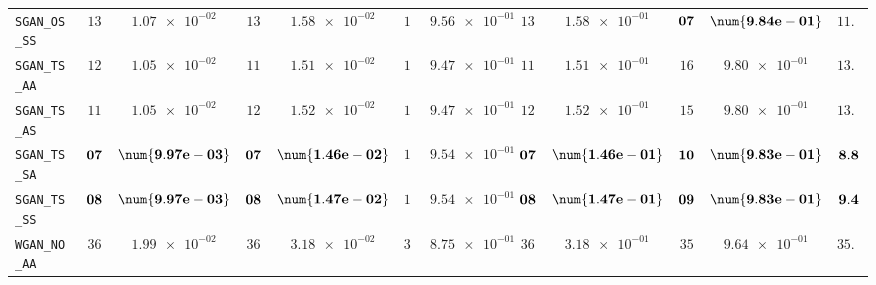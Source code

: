 \begin{xltabular}{\textwidth}{l||cC|cC|cC|cC|cC||c}
	\texttt{SGAN\_OS\_SS} & $ 13$ & $ \num{1.07e-02}$ & $ 13$ & $ \num{1.58e-02}$ & $ 12$ & $ \num{9.56e-01}$ & $ 13$ & $ \num{1.58e-01}$ & $\bf 07$ & $\bf \num{9.84e-01}$ & $ 11.6$  \\
	\texttt{SGAN\_TS\_AA} & $ 12$ & $ \num{1.05e-02}$ & $ 11$ & $ \num{1.51e-02}$ & $ 18$ & $ \num{9.47e-01}$ & $ 11$ & $ \num{1.51e-01}$ & $ 16$ & $ \num{9.80e-01}$ & $ 13.6$  \\
	\texttt{SGAN\_TS\_AS} & $ 11$ & $ \num{1.05e-02}$ & $ 12$ & $ \num{1.52e-02}$ & $ 17$ & $ \num{9.47e-01}$ & $ 12$ & $ \num{1.52e-01}$ & $ 15$ & $ \num{9.80e-01}$ & $ 13.4$  \\
	\texttt{SGAN\_TS\_SA} & $\bf 07$ & $\bf \num{9.97e-03}$ & $\bf 07$ & $\bf \num{1.46e-02}$ & $ 13$ & $ \num{9.54e-01}$ & $\bf 07$ & $\bf \num{1.46e-01}$ & $\bf 10$ & $\bf \num{9.83e-01}$ & $\bf 8.8$  \\
	\texttt{SGAN\_TS\_SS} & $\bf 08$ & $\bf \num{9.97e-03}$ & $\bf 08$ & $\bf \num{1.47e-02}$ & $ 14$ & $ \num{9.54e-01}$ & $\bf 08$ & $\bf \num{1.47e-01}$ & $\bf 09$ & $\bf \num{9.83e-01}$ & $\bf 9.4$  \\ \midrule
	\texttt{WGAN\_NO\_AA} & $ 36$ & $ \num{1.99e-02}$ & $ 36$ & $ \num{3.18e-02}$ & $ 35$ & $ \num{8.75e-01}$ & $ 36$ & $ \num{3.18e-01}$ & $ 35$ & $ \num{9.64e-01}$ & $ 35.6$  \\

\end{xltabular}
